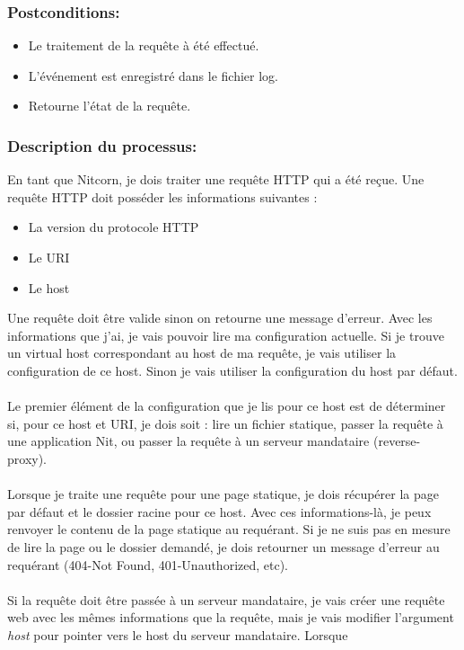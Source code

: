\documentclass{scrreprt}
\begin{document}
\subsubsection{Postconditions:}
\begin{itemize}
    \item Le traitement de la requête à été effectué.
    \item L'événement est enregistré dans le fichier log. 
    \item Retourne l'état de la requête.    
\end{itemize} 
\subsubsection{Description du processus:}En tant que Nitcorn, je dois traiter une requête HTTP qui a été reçue. Une requête HTTP doit posséder les informations suivantes :
\begin{itemize}
    \item La version du protocole HTTP
    \item Le URI
    \item Le host
\end{itemize}
Une requête doit être valide sinon on retourne une message d'erreur. Avec les informations que j'ai, je vais pouvoir lire ma configuration actuelle. Si
je trouve un virtual host correspondant au host de ma requête, je vais utiliser la configuration de ce host. Sinon je vais utiliser la configuration du host par défaut. \\
\\
Le premier élément de la configuration que je lis pour ce host est de déterminer
si, pour ce host et URI, je dois soit : lire un fichier statique, passer la requête
à une application Nit, ou passer la requête à un serveur mandataire (reverse-proxy).\\
\\
Lorsque je traite une requête pour une page statique, je dois récupérer la page par
défaut et le dossier racine pour ce host. Avec ces informations-là, je peux renvoyer
le contenu de la page statique au requérant. Si je ne suis pas en mesure de lire
la page ou le dossier demandé, je dois retourner un message d'erreur au requérant
(404-Not Found, 401-Unauthorized, etc).\\
\\
Si la requête doit être passée à un serveur mandataire, je vais créer
une requête web avec les mêmes informations que la requête, mais je vais modifier
l'argument \textit{host} pour pointer vers le host du serveur mandataire. Lorsque
\end{document}
